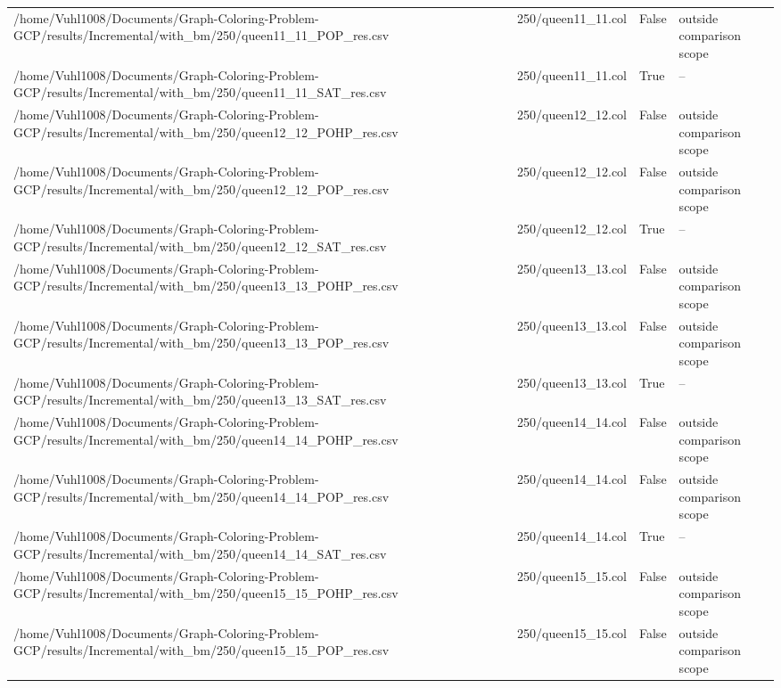 \begin{table}[htbp]
\begin{tabular}{llll}
/home/Vuhl1008/Documents/Graph-Coloring-Problem-GCP/results/Incremental/with\_bm/250/queen11\_11\_POP\_res.csv & 250/queen11\_11.col & False & outside comparison scope \\
/home/Vuhl1008/Documents/Graph-Coloring-Problem-GCP/results/Incremental/with\_bm/250/queen11\_11\_SAT\_res.csv & 250/queen11\_11.col & True & -- \\
/home/Vuhl1008/Documents/Graph-Coloring-Problem-GCP/results/Incremental/with\_bm/250/queen12\_12\_POHP\_res.csv & 250/queen12\_12.col & False & outside comparison scope \\
/home/Vuhl1008/Documents/Graph-Coloring-Problem-GCP/results/Incremental/with\_bm/250/queen12\_12\_POP\_res.csv & 250/queen12\_12.col & False & outside comparison scope \\
/home/Vuhl1008/Documents/Graph-Coloring-Problem-GCP/results/Incremental/with\_bm/250/queen12\_12\_SAT\_res.csv & 250/queen12\_12.col & True & -- \\
/home/Vuhl1008/Documents/Graph-Coloring-Problem-GCP/results/Incremental/with\_bm/250/queen13\_13\_POHP\_res.csv & 250/queen13\_13.col & False & outside comparison scope \\
/home/Vuhl1008/Documents/Graph-Coloring-Problem-GCP/results/Incremental/with\_bm/250/queen13\_13\_POP\_res.csv & 250/queen13\_13.col & False & outside comparison scope \\
/home/Vuhl1008/Documents/Graph-Coloring-Problem-GCP/results/Incremental/with\_bm/250/queen13\_13\_SAT\_res.csv & 250/queen13\_13.col & True & -- \\
/home/Vuhl1008/Documents/Graph-Coloring-Problem-GCP/results/Incremental/with\_bm/250/queen14\_14\_POHP\_res.csv & 250/queen14\_14.col & False & outside comparison scope \\
/home/Vuhl1008/Documents/Graph-Coloring-Problem-GCP/results/Incremental/with\_bm/250/queen14\_14\_POP\_res.csv & 250/queen14\_14.col & False & outside comparison scope \\
/home/Vuhl1008/Documents/Graph-Coloring-Problem-GCP/results/Incremental/with\_bm/250/queen14\_14\_SAT\_res.csv & 250/queen14\_14.col & True & -- \\
/home/Vuhl1008/Documents/Graph-Coloring-Problem-GCP/results/Incremental/with\_bm/250/queen15\_15\_POHP\_res.csv & 250/queen15\_15.col & False & outside comparison scope \\
/home/Vuhl1008/Documents/Graph-Coloring-Problem-GCP/results/Incremental/with\_bm/250/queen15\_15\_POP\_res.csv & 250/queen15\_15.col & False & outside comparison scope \\

\end{tabular}
\end{table}

